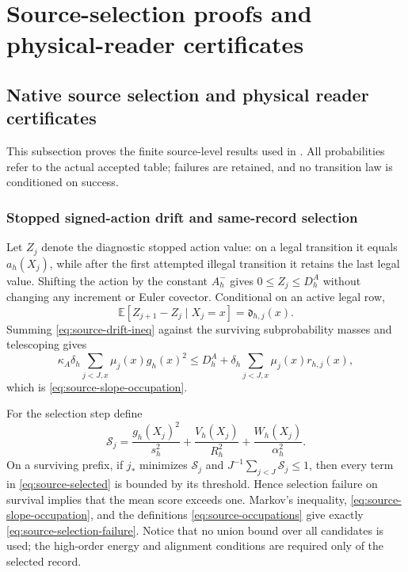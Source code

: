 \documentclass[11pt]{article}
\numberwithin{equation}{section}
\theoremstyle{definition}
\theoremstyle{remark}
\begin{document}
\section{Source-selection proofs and physical-reader certificates}
\label{app:source-proof-package}

\subsection{Native source selection and physical reader certificates}
\label{app:native-source-selection}

This subsection proves the finite source-level results used in .  All probabilities refer to the actual accepted table; failures are retained, and no transition law is conditioned on success.

\subsubsection{Stopped signed-action drift and same-record selection}

Let $Z_j$ denote the diagnostic stopped action value: on a legal transition it equals $a_h(X_j)$, while after the first attempted illegal transition it retains the last legal value.  Shifting the action by the constant $A_h^-$ gives $0\le Z_j\le D_h^A$ without changing any increment or Euler covector.  Conditional on an active legal row,
\begin{equation}
 \mathbb E[Z_{j+1}-Z_j\mid X_j=x]=\mathfrak d_{h,j}(x).
 \label{eq:app-stopped-drift}
\end{equation}
Summing \eqref{eq:source-drift-ineq} against the surviving subprobability masses and telescoping gives
\begin{equation}
 \kappa_A\delta_h\sum_{j<J,x}\mu_j(x)g_h(x)^2
 \le D_h^A+\delta_h\sum_{j<J,x}\mu_j(x)r_{h,j}(x),
 \label{eq:app-slope-telescope}
\end{equation}
which is \eqref{eq:source-slope-occupation}.

For the selection step define
\[
 \mathcal S_j=\frac{g_h(X_j)^2}{s_h^2}
 +\frac{V_h(X_j)}{R_h^2}
 +\frac{W_h(X_j)}{\alpha_h^2}.
\]
On a surviving prefix, if $j_*$ minimizes $\mathcal S_j$ and $J^{-1}\sum_{j<J}\mathcal S_j\le1$, then every term in \eqref{eq:source-selected} is bounded by its threshold.  Hence selection failure on survival implies that the mean score exceeds one.  Markov's inequality, \eqref{eq:source-slope-occupation}, and the definitions \eqref{eq:source-occupations} give exactly \eqref{eq:source-selection-failure}.  Notice that no union bound over all candidates is used; the high-order energy and alignment conditions are required only of the selected record.
\end{document}
